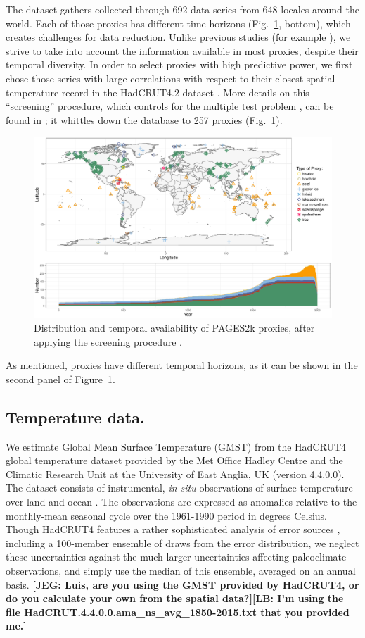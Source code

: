 \documentclass[12pt]{amsart}
\theoremstyle{plain}
\theoremstyle{definition}
\theoremstyle{remark}
\newcommand{\lb}[1]{\color{MidnightBlue}\textbf{[LB: #1]}\normalcolor}
\newcommand{\jeg}[1]{\color{ProcessBlue}\textbf{[JEG: #1]}\normalcolor}
\begin{document}
The dataset gathers collected through 692
data series from 648 locales around the world. Each of those proxies
has different time horizons (Fig.~\ref{fig:proxy}, bottom), which creates challenges for data reduction. Unlike previous studies (for example \cite{Barboza2014}), we strive to take into account the information available in most proxies, despite their temporal diversity.
In order to select proxies with high predictive power, we first chose those series with large correlations with respect to
their closest spatial temperature record in the HadCRUT4.2 dataset \citep{Morice2012}. More
details on this ``screening'' procedure, which controls for the multiple test problem \citep{BenjaminiHochberg95}, can be found in \citep{PAGES2kSD2017allauthors}; it whittles down the database to 257 proxies (Fig.~\ref{fig:proxy}).   
\begin{figure}
  \centering
  \includegraphics[scale=0.40]{CombinedMap_Area}
  \caption{Distribution and temporal availability of PAGES2k proxies, after applying the screening procedure \cite{PAGES2kSD2017allauthors}.}
  \label{fig:proxy}
\end{figure}
As mentioned, proxies have different temporal horizons, as it can be shown in the
second panel of Figure~\ref{fig:proxy}. 


\subsection{Temperature data.}
We estimate Global Mean Surface Temperature (GMST) from the HadCRUT4 global temperature dataset provided by the Met Office Hadley
Centre and the Climatic Research Unit at the University of East Anglia, UK
(version 4.4.0.0). The dataset consists of instrumental, {\it in situ}
observations of surface temperature over land \citep{Jones2012} and ocean
\citep{Kennedy2011, Kennedy2011a}. The
observations are expressed as anomalies relative to the monthly-mean seasonal cycle over the 1961-1990 period in degrees Celsius. Though HadCRUT4 features a rather sophisticated analysis of error sources \citep{Morice2012}, including a 100-member ensemble of draws from the error distribution, we neglect these uncertainties against the much larger uncertainties affecting paleoclimate observations, and simply use the median of this ensemble, averaged on an annual basis.
\jeg{Luis, are you using the GMST provided by HadCRUT4, or do you calculate your
  own from the spatial data?}\lb{I'm using the file
  HadCRUT.4.4.0.0.ama\_ns\_avg\_1850-2015.txt that you provided me.}
\end{document}
